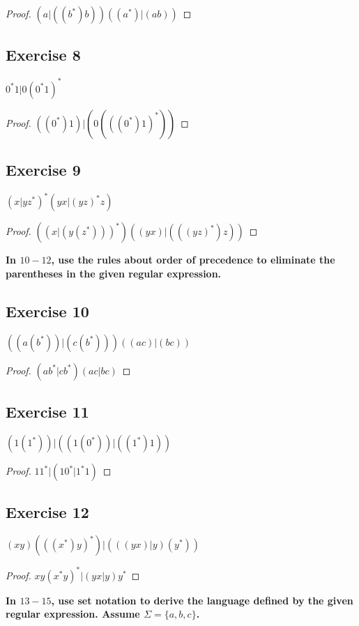 \documentclass[14pt]{extarticle}
\newcommand{\cy}{\color{cyan}}
\begin{document}
\begin{proof}
\((a | ((b^*)b))((a^*) | (ab))\)
\end{proof}

\subsection{Exercise 8}
\(0^*1 | 0(0^*1)^*\)

\begin{proof}
\(((0^*)1) | (0(((0^*)1)^*))\)
\end{proof}

\subsection{Exercise 9}
\((x | yz^*)^*(yx | (yz)^*z)\)

\begin{proof}
\(((x | (y(z^*)))^*) ((yx) | (((yz)^*)z))\)
\end{proof}

{\bf \cy In \(10-12\), use the rules about order of precedence to eliminate the parentheses in the given regular expression.}

\subsection{Exercise 10}
\(((a(b^*)) | (c(b^*))) ((ac) | (bc))\)

\begin{proof}
\((ab^* | cb^*)(ac | bc)\)
\end{proof}

\subsection{Exercise 11}
\((1(1^*)) | ((1(0^*)) | ((1^*)1))\)

\begin{proof}
\(11^* | (10^* | 1^*1)\)
\end{proof}

\subsection{Exercise 12}
\((xy)(((x^*)y)^*) | (((yx) | y)(y^*))\)

\begin{proof}
\(xy(x^*y)^* | (yx | y)y^*\)
\end{proof}

{\bf In \(13-15\), use set notation to derive the language defined by the given regular expression. 
Assume \(\Sigma = \{a, b, c\}\).}
\end{document}
